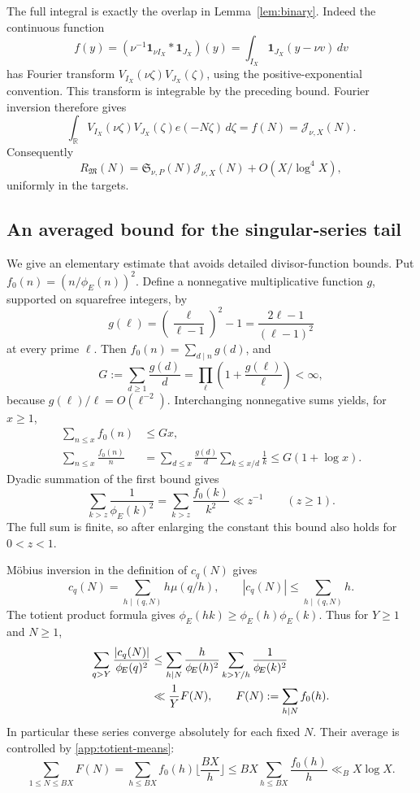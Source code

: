 \documentclass[11pt,letterpaper]{article}
\numberwithin{equation}{section}
\theoremstyle{definition}
\theoremstyle{remark}
\newcommand{\R}{\mathbb R}
\newcommand{\tot}{\phi_{\!E}}
\newcommand{\ind}{\mathbf 1}
\newcommand{\floor}[1]{\lfloor #1\rfloor}
\begin{document}
The full integral is exactly the overlap in Lemma~\ref{lem:binary}.
Indeed the continuous function
\[
 f(y)=\left(\nu^{-1}\ind_{\nu I_X}*\ind_{J_X}\right)(y)
     =\int_{I_X}\ind_{J_X}(y-\nu v)\,dv
\]
has Fourier transform $V_{I_X}(\nu\zeta)V_{J_X}(\zeta)$, using the
positive-exponential convention. This transform is integrable by
the preceding bound. Fourier inversion therefore gives
\[
 \int_\R V_{I_X}(\nu\zeta)V_{J_X}(\zeta)e(-N\zeta)\,d\zeta
 =f(N)=\mathcal J_{\nu,X}(N).
\]
Consequently
\begin{equation}\label{app:major-final}
 R_{\mathfrak M}(N)
 =\mathfrak S_{\nu,P}(N)\mathcal J_{\nu,X}(N)
      +O(X/\log^4X),
\end{equation}
uniformly in the targets.

\subsection{An averaged bound for the singular-series tail}

We give an elementary estimate that avoids detailed divisor-function
bounds. Put $f_0(n)=(n/\tot(n))^2$. Define a nonnegative multiplicative
function $g$, supported on squarefree integers, by
\[
 g(\ell)=\left(\frac{\ell}{\ell-1}\right)^2-1
       =\frac{2\ell-1}{(\ell-1)^2}
\]
at every prime $\ell$. Then
$f_0(n)=\sum_{d\mid n}g(d)$, and
\[
 G:=\sum_{d\ge1}\frac{g(d)}d
   =\prod_\ell\left(1+\frac{g(\ell)}\ell\right)<\infty,
\]
because $g(\ell)/\ell=O(\ell^{-2})$.
Interchanging nonnegative sums yields, for $x\ge1$,
\begin{equation}\label{app:totient-means}
 \begin{aligned}
 \sum_{n\le x}f_0(n)&\le Gx,\\
 \sum_{n\le x}\frac{f_0(n)}n
 &=\sum_{d\le x}\frac{g(d)}d\sum_{k\le x/d}\frac1k
 \le G(1+\log x).
 \end{aligned}
\end{equation}
Dyadic summation of the first bound gives
\[
 \sum_{k>z}\frac1{\tot(k)^2}
 =\sum_{k>z}\frac{f_0(k)}{k^2}\ll z^{-1}\qquad(z\ge1).
\]
The full sum is finite, so after enlarging the constant this bound
also holds for $0<z<1$.

M\"obius inversion in the definition of $c_q(N)$ gives
\[
 c_q(N)=\sum_{h\mid(q,N)}h\mu(q/h),\qquad
 |c_q(N)|\le\sum_{h\mid(q,N)}h.
\]
The totient product formula gives
$\tot(hk)\ge\tot(h)\tot(k)$. Thus for $Y\ge1$ and $N\ge1$,
\begin{align}
 \sum_{q>Y}\frac{|c_q(N)|}{\tot(q)^2}
 &\le\sum_{h\mid N}\frac{h}{\tot(h)^2}
                 \sum_{k>Y/h}\frac1{\tot(k)^2}
 \notag\\
 &\ll\frac1Y F(N),\qquad
 F(N):=\sum_{h\mid N}f_0(h).\label{app:series-tail}
\end{align}
In particular these series converge absolutely for each fixed $N$.
Their average is controlled by \eqref{app:totient-means}:
\begin{equation}\label{app:F-mean}
 \sum_{1\le N\le BX}F(N)
 =\sum_{h\le BX}f_0(h)\floor{\frac{BX}{h}}
 \le BX\sum_{h\le BX}\frac{f_0(h)}h
 \ll_B X\log X.
\end{equation}
\end{document}
